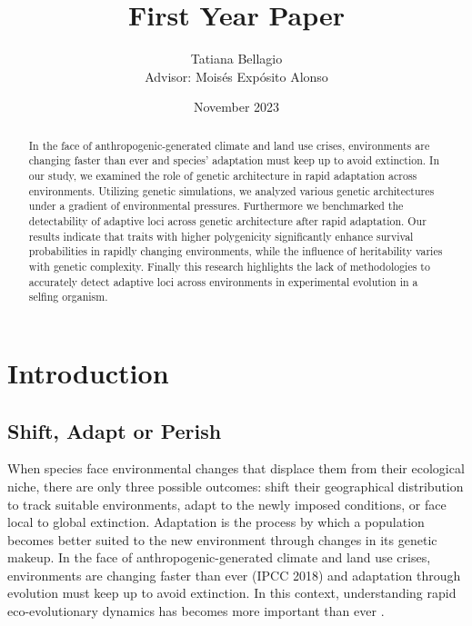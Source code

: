 \documentclass{article}
\title{First Year Paper} %
\author{Tatiana Bellagio \\ Advisor: Moisés Expósito Alonso}
\date{November 2023}
\begin{document}
\maketitle

\begin{abstract}
In the face of anthropogenic-generated climate and land use crises, environments are changing faster than ever and species' adaptation must keep up to avoid extinction. In our study, we examined the role of genetic architecture in rapid adaptation across environments. Utilizing genetic simulations, we analyzed various genetic architectures under a gradient of environmental pressures. Furthermore we benchmarked the detectability of adaptive loci across genetic architecture after rapid adaptation. Our results indicate that traits with higher polygenicity significantly enhance survival probabilities in rapidly changing environments, while the influence of heritability varies with genetic complexity. Finally this research highlights the lack of methodologies to accurately detect adaptive loci across environments in experimental evolution in a selfing organism. 
\end{abstract}

\tableofcontents
\newpage %

\section{Introduction}
\subsection{Shift, Adapt or Perish}
When species face environmental changes that displace them from their ecological niche, there are only three possible outcomes: shift their geographical distribution to track suitable environments, adapt to the newly imposed conditions, or face local to global extinction. Adaptation is the process by which a population becomes better suited to the new environment through changes in its genetic makeup. In the face of anthropogenic-generated climate and land use crises, environments are changing faster than ever (IPCC 2018) and adaptation through evolution must keep up to avoid extinction. In this context, understanding rapid eco-evolutionary dynamics has becomes more important than ever \citep{Waldvogel2020-dh, Palumbi2002-li, Stockwell2003-da}. 
\end{document}
